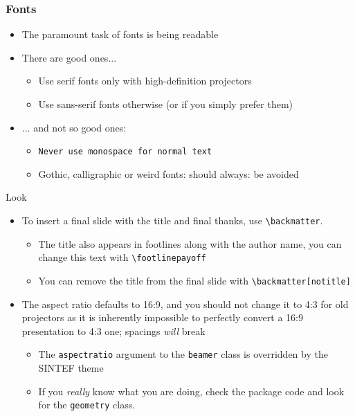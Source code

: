 
\begin{frame}
\frametitle{Fonts}
\begin{itemize}
    \item The paramount task of fonts is being readable
    \item There are good ones...
      \begin{itemize}
          \item {\textrm{Use serif fonts only with high-definition projectors}}
          \item {\textsf{Use sans-serif fonts otherwise (or if you simply prefer them)}}
      \end{itemize}
    \item ... and not so good ones:
    \begin{itemize}
        \item {\texttt{Never use monospace for normal text}}
        \item {\frakfamily Gothic, calligraphic or weird fonts: should always: be avoided}
\end{itemize}
\end{itemize}
\end{frame}


\begin{frame}[fragile]{Look}
\begin{itemize}
    \item To insert a final slide with the title and final thanks, use \verb|\backmatter|.
    \begin{itemize}
        \item The title also appears in footlines along with the author name, you can change this text with \verb|\footlinepayoff|
        \item You can remove the title from the final slide with \verb|\backmatter[notitle]|
    \end{itemize}
    \item The aspect ratio defaults to 16:9, and you should not change it to 4:3 for old projectors as it is inherently impossible to perfectly convert a 16:9 presentation to 4:3 one; spacings \emph{will} break
    \begin{itemize}    
        \item The \texttt{aspectratio} argument to the \texttt{beamer} class is overridden by the SINTEF theme
        \item If you \emph{really} know what you are doing, check the package code and look for the \texttt{geometry} class.
    \end{itemize}
\end{itemize}
\end{frame}

\footlinecolor{}